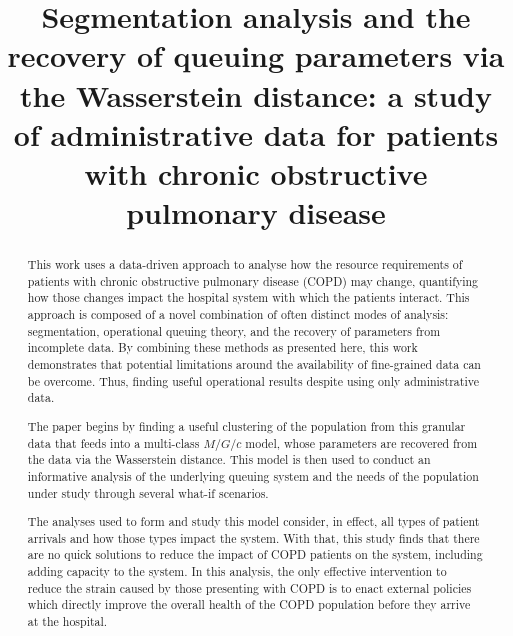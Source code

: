 \documentclass[]{interact}
\theoremstyle{plain}%
\theoremstyle{definition}
\theoremstyle{remark}
\begin{document}

\title{%
  Segmentation analysis and the recovery of queuing parameters via the
  Wasserstein distance: a study of administrative data for patients with chronic
  obstructive pulmonary disease
}

\author{%
}

\maketitle

\begin{abstract}
This work uses a data-driven approach to analyse how the resource requirements
of patients with chronic obstructive pulmonary disease (COPD) may change,
quantifying how those changes impact the hospital system with which the patients
interact. This approach is composed of a novel combination of often distinct
modes of analysis: segmentation, operational queuing theory, and the recovery of
parameters from incomplete data. By combining these methods as presented here,
this work demonstrates that potential limitations around the availability of
fine-grained data can be overcome. Thus, finding useful operational results
despite using only administrative data.

The paper begins by finding a useful clustering of the population from this
granular data that feeds into a multi-class \(M/G/c\) model, whose parameters
are recovered from the data via the Wasserstein distance. This model is then
used to conduct an informative analysis of the underlying queuing system and the
needs of the population under study through several what-if scenarios.

The analyses used to form and study this model consider, in effect, all types of
patient arrivals and how those types impact the system. With that, this study
finds that there are no quick solutions to reduce the impact of COPD patients on
the system, including adding capacity to the system. In this analysis, the only
effective intervention to reduce the strain caused by those presenting with COPD
is to enact external policies which directly improve the overall health of the
COPD population before they arrive at the hospital.
\end{abstract}
\end{document}
